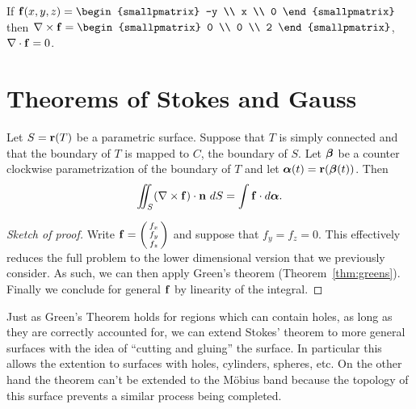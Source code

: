 \begin{example*}
    If \(\ff(x,y,z) = \begin{smallpmatrix}
        -y \\ x \\ 0
    \end{smallpmatrix}\)
    then
    \(\nabla \times \ff = \begin{smallpmatrix}
        0 \\ 0 \\ 2
    \end{smallpmatrix}\),
    \(\nabla \cdot \mathbf{f} = 0\).
\end{example*}



\section{Theorems of Stokes and Gauss}

\begin{theorem}[Stokes]
    Let \(S=\mathbf{r}(T)\) be a parametric surface.
    Suppose that \(T\) is simply connected and that the boundary of \(T\) is mapped to \(C\), the boundary of \(S\).
    Let \(\boldsymbol{\beta}\) be a counter clockwise parametrization of the boundary of \(T\) and let \(\boldsymbol{\alpha}(t) = \mathbf{r}(\boldsymbol{\beta}(t))\).
    Then
    \[
        \iint_{S} (\nabla \times \mathbf{f}) \cdot \mathbf{n} \ dS = \int \mathbf{f} \cdot d\boldsymbol{\alpha}.
    \]
\end{theorem}


\begin{proof}[Sketch of proof]
    Write \(\mathbf{f} = \left(\begin{smallmatrix}
            f_x \\ f_y \\ f_z
        \end{smallmatrix}\right)\)
    and suppose that \(f_y = f_z = 0\).
    This effectively reduces the full problem to the lower dimensional version that we previously consider.
    As such, we can then apply Green's theorem (Theorem~\ref{thm:greens}).
    Finally we conclude for general \(\mathbf{f}\) by linearity of the integral.
\end{proof}

Just as Green's Theorem holds for regions which can contain holes, as long as they are correctly accounted for, we can extend Stokes' theorem to more general surfaces with the idea of ``cutting and gluing'' the surface.
In particular this allows the extention to surfaces with holes, cylinders, spheres, etc.
On the other hand the theorem can't be extended to the Möbius band because the topology of this surface prevents a similar process being completed.

